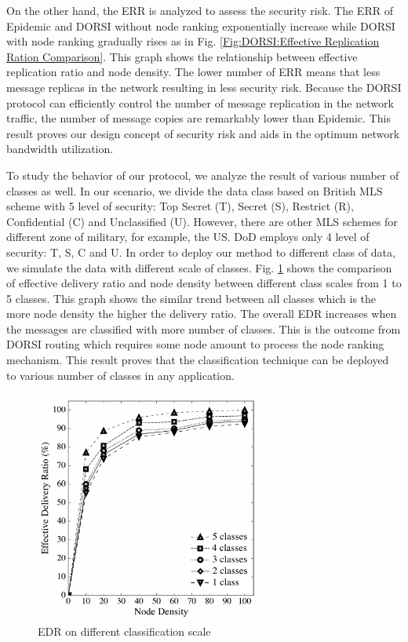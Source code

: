 On the other hand, the ERR is analyzed to assess the security risk. 
The ERR of Epidemic and DORSI without node ranking exponentially increase while DORSI with node ranking gradually rises as in Fig. \ref{Fig:DORSI:Effective Replication Ration Comparison}. 
This graph shows the relationship between effective replication ratio and node density. 
The lower number of ERR means that less message replicas in the network resulting in less security risk. 
Because the DORSI protocol can efficiently control the number of message replication in the network traffic, the number of message copies are remarkably lower than Epidemic. 
This result proves our design concept of security risk and aids in the optimum network bandwidth utilization.

To study the behavior of our protocol, we analyze the result of various number of classes as well. 
In our scenario, we divide the data class based on British MLS scheme with 5 level of security: Top Secret (T), Secret (S), Restrict (R), Confidential (C) and Unclassified (U). 
However, there are other MLS schemes for different zone of military, for example, the US. 
DoD employs only 4 level of security: T, S, C and U. In order to deploy our method to different class of data, we simulate the data with different scale of classes. 
Fig. \ref{Fig:DORSI:EDR on different classification scale} shows the comparison of effective delivery ratio and node density between different class scales from 1 to 5 classes. 
This graph shows the similar trend between all classes which is the more node density the higher the delivery ratio. 
The overall EDR increases when the messages are classified with more number of classes. 
This is the outcome from DORSI routing which requires some node amount to process the node ranking mechanism. 
This result proves that the classification technique can be deployed to various number of classes in any application.

\begin{figure}[!h]
\centering
\includegraphics[width=3in]{Graphs/EDRondifferentclassificationscale.pdf}
\caption{EDR on different classification scale}
\label{Fig:DORSI:EDR on different classification scale}
\end{figure}

